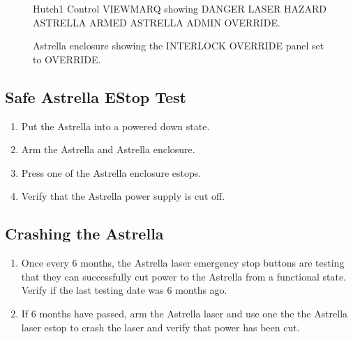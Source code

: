 \documentclass[letterpaper,10pt,english]{sphinxmanual}
\begin{document}
\begin{figure}[htbp]
\centering
\capstart

\noindent{}
\caption{ Hutch\sphinxhyphen{}1 Control VIEWMARQ showing DANGER LASER HAZARD \sphinxhyphen{} ASTRELLA ARMED \sphinxhyphen{} ASTRELLA ADMIN OVERRIDE.}\label{\detokenize{testing_documentation/Hutch-1_laser:id12}}\end{figure}

\begin{figure}[htbp]
\centering
\capstart

\noindent{}
\caption{ Astrella enclosure showing the INTERLOCK OVERRIDE panel set to OVERRIDE.}\label{\detokenize{testing_documentation/Hutch-1_laser:id13}}\end{figure}


\subsection{Safe Astrella E\sphinxhyphen{}Stop Test}
\label{\detokenize{testing_documentation/Hutch-1_laser:safe-astrella-e-stop-test}}\begin{enumerate}
%
\item {} 
\sphinxAtStartPar
Put the Astrella into a powered down state.

\item {} 
\sphinxAtStartPar
Arm the Astrella and Astrella enclosure.

\item {} 
\sphinxAtStartPar
Press one of the Astrella enclosure e\sphinxhyphen{}stops.

\item {} 
\sphinxAtStartPar
Verify that the Astrella power supply is cut off.

\end{enumerate}


\subsection{Crashing the Astrella}
\label{\detokenize{testing_documentation/Hutch-1_laser:crashing-the-astrella}}\begin{enumerate}
%
\item {} 
\sphinxAtStartPar
Once every 6 months, the Astrella laser emergency stop buttons are testing that they can successfully cut power to the Astrella from a functional state.
Verify if the last testing date was 6 months ago.

\item {} 
\sphinxAtStartPar
If 6 months have passed, arm the Astrella laser and use one the the Astrella laser e\sphinxhyphen{}stop to crash the laser and verify that power has been cut.

\end{enumerate}
\end{document}
